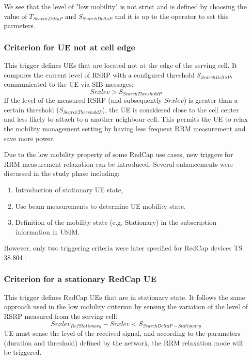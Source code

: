 \documentclass[conference]{IEEEtran}
\begin{document}
We see that the level of "low mobility" is not strict and is defined by choosing the value of $T_{SearchDeltaP}$ and  $S_{SearchDeltaP}$ and it is up to the operator to set this parmeters.\\
\subsubsection*{\textbf{Criterion for UE not at cell edge}} This trigger defines UEs that are located not at the edge of the serving cell. It compares the current level of RSRP with a configured threshold $S_{SearchDeltaP}$, communicated to the UE via SIB messages:
\begin{equation}
Srxlev>S_{SearchThresholdP}
\label{equ:not-at-the-edge-criterion}
\end{equation}
If the level of the measured RSRP (and subsequently $Srxlev$) is greater than a certain threshold ($S_{SearchThresholdP}$), the UE is considered close to the cell center and less likely to attach to a another neighbour cell. This permits the UE to relax the mobility management setting by having less frequent RRM measurement and save more power.

Due to the low mobility property of some RedCap use cases, new triggers for RRM measurement relaxation can be introduced. Several enhancements were discussed in the study phase including:
\begin{enumerate}
    \item Introduction of stationary UE state,
    \item Use beam measurements to determine UE mobility state,
    \item Definition of the mobility state (e.g, Stationary) in the subscription information in USIM.
\end{enumerate}
However, only two triggering criteria were later specified for RedCap devices TS 38.804 \cite{3gpp_study_nodate-4_38.804}:\\
\subsubsection*{\textbf{Criterion for a stationary RedCap UE}} This trigger defines RedCap UEs that are in stationary state. It follows the same approach used in the low mobility criterion by sensing the variation of the level of RSRP measured from the serving cell:
\begin{equation}
Srxlev_{RefStationary}-Srxlev<S_{SearchDeltaP-Stationary}
\label{equ:stationary-criterion}
\end{equation}
UE must sense the level of the received signal, and according to the parameters (duration and threshold) defined by the network, the RRM relaxation mode will be triggered. 
\end{document}
